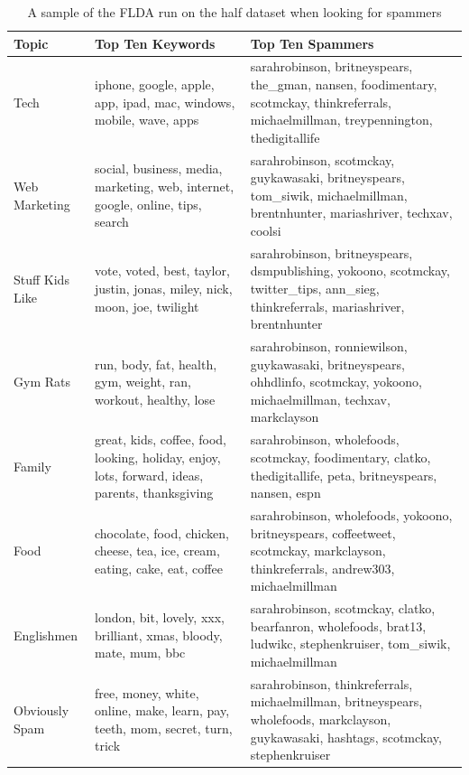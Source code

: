 \documentclass[a4paper]{article}
\begin{document}
\begin{table}[h]
  \centering %
  \begin{tabular}{ |L{5cm}|L{5cm}|L{5cm}| }
    \hline
    Topic & Top Ten Keywords & Top Ten Spammers \\
    \hline
    \hline
    Tech & iphone, google, apple, app, ipad, mac, windows, mobile, wave, apps & sarahrobinson, britneyspears, the\_gman, nansen, foodimentary, scotmckay, thinkreferrals, michaelmillman, treypennington, thedigitallife \\
    \hline
    Web Marketing & social, business, media, marketing, web, internet, google, online, tips, search & sarahrobinson, scotmckay, guykawasaki, britneyspears, tom\_siwik, michaelmillman, brentnhunter, mariashriver, techxav, coolsi \\
    \hline
    Stuff Kids Like & vote, voted, best, taylor, justin, jonas, miley, nick, moon, joe, twilight & sarahrobinson, britneyspears, dsmpublishing, yokoono, scotmckay, twitter\_tips, ann\_sieg, thinkreferrals, mariashriver, brentnhunter \\
    \hline
    Gym Rats & run, body, fat, health, gym, weight, ran, workout, healthy, lose & sarahrobinson, ronniewilson, guykawasaki, britneyspears, ohhdlinfo, scotmckay, yokoono, michaelmillman, techxav, markclayson \\
    \hline
    Family & great, kids, coffee, food, looking, holiday, enjoy, lots, forward, ideas, parents, thanksgiving & sarahrobinson, wholefoods, scotmckay, foodimentary, clatko, thedigitallife, peta, britneyspears, nansen, espn \\
    \hline
    Food & chocolate, food, chicken, cheese, tea, ice, cream, eating, cake, eat, coffee & sarahrobinson, wholefoods, yokoono, britneyspears, coffeetweet, scotmckay, markclayson, thinkreferrals, andrew303, michaelmillman \\
    \hline
    Englishmen & london, bit, lovely, xxx, brilliant, xmas, bloody, mate, mum, bbc & sarahrobinson, scotmckay, clatko, bearfanron, wholefoods, brat13, ludwikc, stephenkruiser, tom\_siwik, michaelmillman \\
    \hline
    Obviously Spam & free, money, white, online, make, learn, pay, teeth, mom, secret, turn, trick & sarahrobinson, thinkreferrals, michaelmillman, britneyspears, wholefoods, markclayson, guykawasaki, hashtags, scotmckay, stephenkruiser \\
    \hline
  \end{tabular}
  \caption{A sample of the FLDA run on the half dataset when looking for spammers}
  \label{tab:flda_half}
\end{table}
\end{document}
